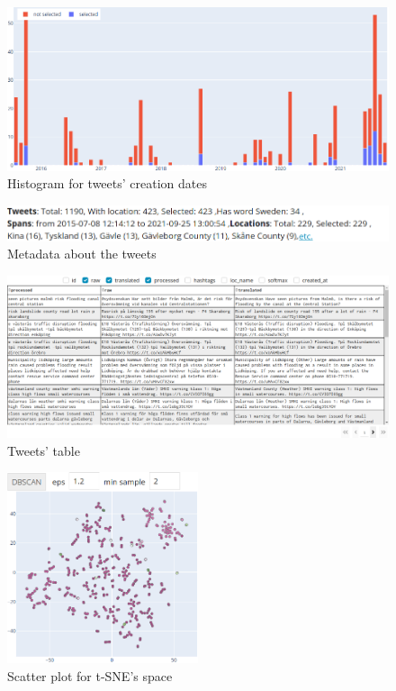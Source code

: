 \documentclass{beamer}
\begin{document}
\begin{frame}
  \begin{figure}
    \includegraphics[width=\textwidth]{../report/images/histogram.png}
    \caption{Histogram for tweets' creation dates}
  \end{figure}
\end{frame}

\begin{frame}
  \begin{figure}
    \includegraphics[width=\textwidth]{../report/images/meta_data.png}
    \caption{Metadata about the tweets}
  \end{figure}
  \begin{figure}
    \includegraphics[width=\textwidth]{./images/tweets_table.png}
    \caption{Tweets' table}
  \end{figure}
\end{frame}

\begin{frame}
  \begin{figure}
    \includegraphics[width=0.5\textwidth]{../report/images/scatter.png}
    \caption{Scatter plot for t-SNE's space}
  \end{figure}
\end{frame}
\end{document}
